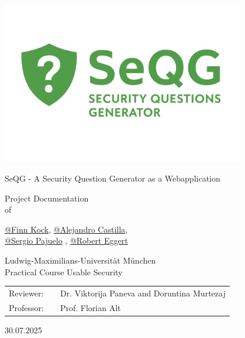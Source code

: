 \documentclass{thesisclass}
\makeatletter
\newcommand{\type}{Project Documentation}
\newcommand{\group}{\href{https://github.com/finnkock}{@Finn Kock}, \href{https://github.com/alecasbar}{@Alejandro Castilla}, \\
					\href{https://github.com/sergioPajuelo}{@Sergio Pajuelo} , \href{https://github.com/RobertEggert}{@Robert Eggert}}
\newcommand{\mytitle}{SeQG - A Security Question Generator as a Webapplication}
\newcommand{\course}{Practical Course Usable Security}
\newcommand{\reviewerone}{Dr. Viktorija Paneva and Doruntina Murtezaj}
\newcommand{\prof}{Prof. Florian Alt}
\newcommand{\timeend}{30.07.2025}
\makeatother
\begin{document}
\begin{titlepage}
    \centering

    \includegraphics[width=0.8\textwidth]{Documentation-Paper/images/LogoAndText.png}

    \vspace{0.8cm}


    \Huge{\mytitle}
    \vspace{0.8cm} %

    \Large{
        \type\\of
    }

    \vspace{0.5cm} %

    \huge{\group}

    \vspace{0.5cm} %

    \Large{
        Ludwig-Maximilians-Universität München \\
        \course
    }

    \vspace{0.8cm} %

    \Large{
        \begin{tabular}[ht]{l c l}
            Reviewer: & \hfill & \reviewerone \\
            Professor: & \hfill & \prof
        \end{tabular}
    }

    \vspace{0.8cm} %

    \Large{\timeend}

\end{titlepage}

\renewcommand{\contentsname}{Index}
\tableofcontents
\clearpage





\end{document}
